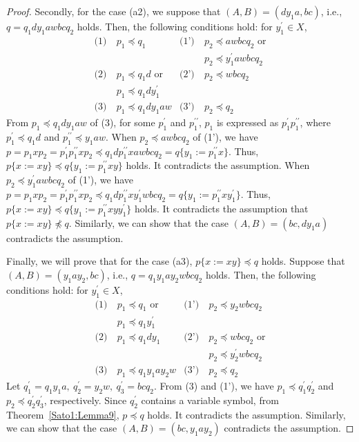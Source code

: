 \begin{proof}
  Secondly, for the case (a2), we suppose that $(A, B) = (dy_{1}a, bc)$, i.e., $q = q_{1}dy_{1}awbcq_{2} $ holds. Then, the following conditions hold: for $y_{1}^{\prime}\in X$,
  \begin{align*}
    \textrm{(1)}~& p_{1} \preceq q_{1} & \textrm{(1')}~& p_{2} \preceq awbcq_{2}\mbox{ or} \\
    & & & p_{2} \preceq y_{1}^{\prime}awbcq_{2}\\
    \textrm{(2)}~& p_{1} \preceq q_{1}d\mbox{ or}  & \textrm{(2')}~& p_{2} \preceq wbcq_{2}\\
    & p_{1} \preceq q_{1}dy_{1}^{\prime} & & \\
    \textrm{(3)}~& p_{1} \preceq q_{1}dy_{1}aw & \textrm{(3')}~& p_{2} \preceq q_{2}
  \end{align*}
  From $p_{1} \preceq q_{1}dy_{1}aw$ of (3), for some $p^{\prime}_{1}$ and $p^{\prime\prime}_{1}$, $p_{1}$ is expressed as $p^{\prime}_{1}p^{\prime\prime}_{1}$, where $p^{\prime}_{1} \preceq q_{1}d$ and $p^{\prime\prime}_{1} \preceq y_{1}aw$. 
  When $p_{2} \preceq awbcq_{2}$ of (1'), we have $p=p_{1}xp_{2}=p^{\prime}_{1}p^{\prime\prime}_{1}xp_{2} \preceq q_{1}dp^{\prime\prime}_{1}xawbcq_{2}=q \{ y_{1}:=p^{\prime\prime}_{1}x \}$.
  Thus, $p \{ x := xy \} \preceq q \{ y_{1}:=p^{\prime\prime}_{1}xy \}$ holds. It contradicts the assumption.
  When $p_{2} \preceq y_{1}^{\prime}awbcq_{2}$ of (1'), we have $p=p_{1}xp_{2}=p^{\prime}_{1}p^{\prime\prime}_{1}xp_{2} \preceq q_{1}dp^{\prime\prime}_{1}xy_{1}^{\prime}wbcq_{2}=q \{ y_{1}:=p^{\prime\prime}_{1}xy_{1}^{\prime} \}$.
  Thus, $p \{ x := xy \} \preceq q \{ y_{1}:=p^{\prime\prime}_{1}xyy_{1}^{\prime} \}$ holds. It contradicts the assumption that $p \{ x := xy \} \not\preceq q$.
  Similarly, we can show that the case $(A, B) = (bc, dy_{1}a)$ contradicts the assumption.
  
  Finally, we will prove that for the case (a3), $p \{ x := xy \} \preceq q$ holds. Suppose that $(A, B) = (y_{1}ay_{2}, bc)$, i.e., $q = q_{1}y_{1}ay_{2}wbcq_{2} $ holds. Then, the following conditions hold: for $y_{1}^{\prime}\in X$,
  \begin{align*}
    \textrm{(1)}~& p_{1} \preceq q_{1}\mbox{ or} & \textrm{(1')}~& p_{2} \preceq y_{2}wbcq_{2} \\
    & p_{1} \preceq q_{1}y_{1}^{\prime} & & \\
    \textrm{(2)}~& p_{1} \preceq q_{1}dy_{1} & \textrm{(2')}~& p_{2} \preceq wbcq_{2}\mbox{ or}\\    
    & & & p_{2} \preceq y_{2}^{\prime}wbcq_{2} \\
    \textrm{(3)}~& p_{1} \preceq q_{1}y_{1}ay_{2}w & \textrm{(3')}~& p_{2} \preceq q_{2}
  \end{align*}
  Let $q^{\prime}_{1}=q_{1}y_{1}a,~q^{\prime}_{2}=y_{2}w,~q^{\prime}_{3}=bcq_{2}$. From (3) and (1'), we have $p_{1} \preceq q^{\prime}_{1}q^{\prime}_{2}$ and $p_{2} \preceq q^{\prime}_{2}q^{\prime}_{3}$, respectively. Since $q_{2}^{\prime}$ contains a variable symbol,
  from Theorem~\ref{Sato1:Lemma9}, $p \preceq q$ holds. It contradicts the assumption.
  Similarly, we can show that the case $(A, B) = (bc, y_{1}ay_{2})$ contradicts the assumption.
  

\end{proof}
